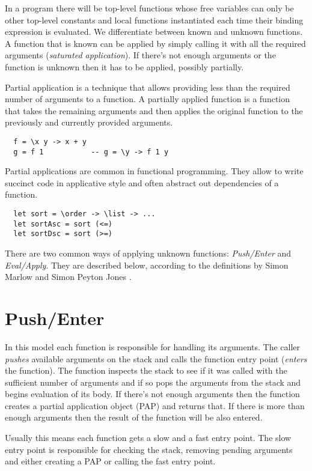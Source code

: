 \documentclass[en]{pracamgr}
\begin{document}
In a program there will be top-level functions whose free variables
can only be other top-level constants and local functions instantiated
each time their binding expression is evaluated.
We differentiate between known and unknown functions.
A function that is known can be applied by simply
calling it with all the required arguments (\textit{saturated application}).
If there's not enough arguments or the function is unknown then it has
to be applied, possibly partially.

Partial application is a technique that allows providing less than
the required number of arguments to a function.
A partially applied function is a function
that takes the remaining arguments and then applies the original function
to the previously and currently provided arguments.

\begin{verbatim}
  f = \x y -> x + y
  g = f 1           -- g = \y -> f 1 y
\end{verbatim}

Partial applications are common in functional programming.
They allow to write succinct code in applicative style and often
abstract out dependencies of a function.

\begin{verbatim}
  let sort = \order -> \list -> ...
  let sortAsc = sort (<=)
  let sortDsc = sort (>=)
\end{verbatim}

There are two common ways of applying unknown functions:
\textit{Push/Enter} and \textit{Eval/Apply}. They are described
below, according to the
definitions by Simon Marlow and Simon Peyton Jones \cite{fastcurry}.

\section{Push/Enter}
In this model each function is responsible for handling its arguments.
The caller \textit{pushes} available arguments on the stack and calls the
function entry point (\textit{enters} the function).
The function inspects the stack to see if it was called with the
sufficient number of arguments and if so pops the arguments from
the stack and begins evaluation of its body. If there's not enough
arguments then the function creates a partial application object (PAP)
and returns that. If there is more than enough arguments then the result
of the function will be also entered.

Usually this means each function gets a slow and a fast entry point.
The slow entry point is responsible for checking the stack, removing
pending arguments and either creating a PAP or calling the fast entry point.
\end{document}
